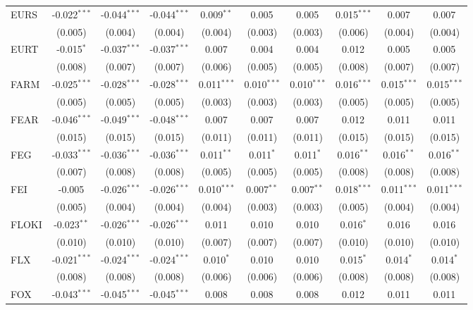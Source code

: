 \begin{table}[!htbp]
\begin{tabular}{@{\extracolsep{5pt}}lccccccccc}
 EURS & -0.022$^{***}$ & -0.044$^{***}$ & -0.044$^{***}$ & 0.009$^{**}$ & 0.005$^{}$ & 0.005$^{}$ & 0.015$^{***}$ & 0.007$^{}$ & 0.007$^{}$ \\
  & (0.005) & (0.004) & (0.004) & (0.004) & (0.003) & (0.003) & (0.006) & (0.004) & (0.004) \\
 EURT & -0.015$^{*}$ & -0.037$^{***}$ & -0.037$^{***}$ & 0.007$^{}$ & 0.004$^{}$ & 0.004$^{}$ & 0.012$^{}$ & 0.005$^{}$ & 0.005$^{}$ \\
  & (0.008) & (0.007) & (0.007) & (0.006) & (0.005) & (0.005) & (0.008) & (0.007) & (0.007) \\
 FARM & -0.025$^{***}$ & -0.028$^{***}$ & -0.028$^{***}$ & 0.011$^{***}$ & 0.010$^{***}$ & 0.010$^{***}$ & 0.016$^{***}$ & 0.015$^{***}$ & 0.015$^{***}$ \\
  & (0.005) & (0.005) & (0.005) & (0.003) & (0.003) & (0.003) & (0.005) & (0.005) & (0.005) \\
 FEAR & -0.046$^{***}$ & -0.049$^{***}$ & -0.048$^{***}$ & 0.007$^{}$ & 0.007$^{}$ & 0.007$^{}$ & 0.012$^{}$ & 0.011$^{}$ & 0.011$^{}$ \\
  & (0.015) & (0.015) & (0.015) & (0.011) & (0.011) & (0.011) & (0.015) & (0.015) & (0.015) \\
 FEG & -0.033$^{***}$ & -0.036$^{***}$ & -0.036$^{***}$ & 0.011$^{**}$ & 0.011$^{*}$ & 0.011$^{*}$ & 0.016$^{**}$ & 0.016$^{**}$ & 0.016$^{**}$ \\
  & (0.007) & (0.008) & (0.008) & (0.005) & (0.005) & (0.005) & (0.008) & (0.008) & (0.008) \\
 FEI & -0.005$^{}$ & -0.026$^{***}$ & -0.026$^{***}$ & 0.010$^{***}$ & 0.007$^{**}$ & 0.007$^{**}$ & 0.018$^{***}$ & 0.011$^{***}$ & 0.011$^{***}$ \\
  & (0.005) & (0.004) & (0.004) & (0.004) & (0.003) & (0.003) & (0.005) & (0.004) & (0.004) \\
 FLOKI & -0.023$^{**}$ & -0.026$^{***}$ & -0.026$^{***}$ & 0.011$^{}$ & 0.010$^{}$ & 0.010$^{}$ & 0.016$^{*}$ & 0.016$^{}$ & 0.016$^{}$ \\
  & (0.010) & (0.010) & (0.010) & (0.007) & (0.007) & (0.007) & (0.010) & (0.010) & (0.010) \\
 FLX & -0.021$^{***}$ & -0.024$^{***}$ & -0.024$^{***}$ & 0.010$^{*}$ & 0.010$^{}$ & 0.010$^{}$ & 0.015$^{*}$ & 0.014$^{*}$ & 0.014$^{*}$ \\
  & (0.008) & (0.008) & (0.008) & (0.006) & (0.006) & (0.006) & (0.008) & (0.008) & (0.008) \\
 FOX & -0.043$^{***}$ & -0.045$^{***}$ & -0.045$^{***}$ & 0.008$^{}$ & 0.008$^{}$ & 0.008$^{}$ & 0.012$^{}$ & 0.011$^{}$ & 0.011$^{}$ \\

\end{tabular}
\end{table}
